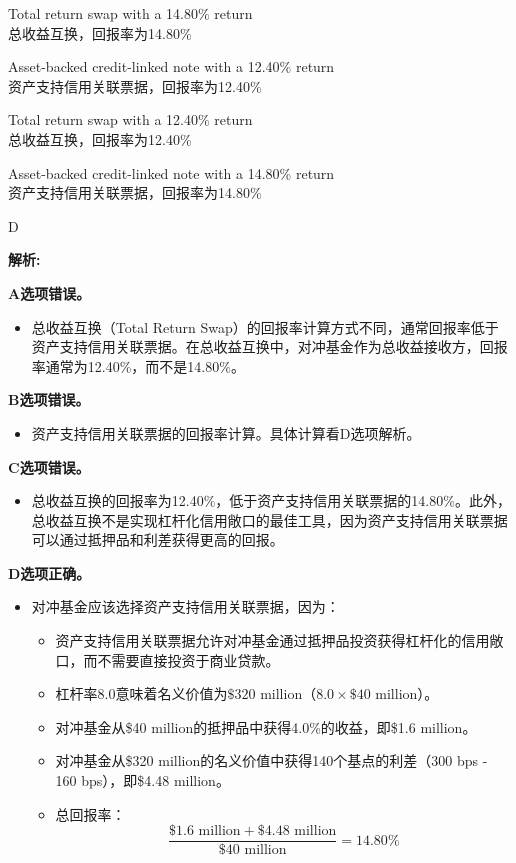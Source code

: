 \documentclass{article}
\newenvironment{explanation}
{\textbf{解析:}\par}
{\par}
\begin{document}
\begin{choices}
    \item Total return swap with a 14.80\% return\\
    总收益互换，回报率为14.80\%
    \item Asset-backed credit-linked note with a 12.40\% return\\
    资产支持信用关联票据，回报率为12.40\%
    \item Total return swap with a 12.40\% return\\
    总收益互换，回报率为12.40\%
    \item Asset-backed credit-linked note with a 14.80\% return\\
    资产支持信用关联票据，回报率为14.80\%
\end{choices}

\begin{correctanswer}
    D
\end{correctanswer}
\begin{explanation}
\textbf{A选项错误。}
\begin{itemize}
    \item 总收益互换（Total Return Swap）的回报率计算方式不同，通常回报率低于资产支持信用关联票据。在总收益互换中，对冲基金作为总收益接收方，回报率通常为12.40\%，而不是14.80\%。
\end{itemize}

\textbf{B选项错误。}
\begin{itemize}
    \item 资产支持信用关联票据的回报率计算。具体计算看D选项解析。
\end{itemize}

\textbf{C选项错误。}
\begin{itemize}
    \item 总收益互换的回报率为12.40\%，低于资产支持信用关联票据的14.80\%。此外，总收益互换不是实现杠杆化信用敞口的最佳工具，因为资产支持信用关联票据可以通过抵押品和利差获得更高的回报。
\end{itemize}

\textbf{D选项正确。}
\begin{itemize}
    \item 对冲基金应该选择资产支持信用关联票据，因为：
    \begin{itemize}
        \item 资产支持信用关联票据允许对冲基金通过抵押品投资获得杠杆化的信用敞口，而不需要直接投资于商业贷款。
        \item 杠杆率8.0意味着名义价值为$\$320\text{ million}$（$8.0 \times \$40\text{ million}$）。
        \item 对冲基金从\$40 million的抵押品中获得4.0\%的收益，即\$1.6 million。
        \item 对冲基金从\$320 million的名义价值中获得140个基点的利差（300 bps - 160 bps），即\$4.48 million。
        \item 总回报率：\[\frac{\$1.6\text{ million} + \$4.48\text{ million}}{\$40\text{ million}} = 14.80\%\]
    \end{itemize}
\end{itemize}
\end{explanation}
\end{document}
